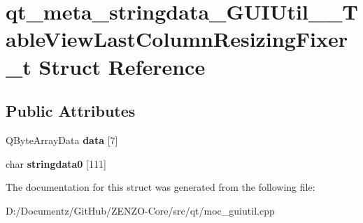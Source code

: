 \hypertarget{structqt__meta__stringdata___g_u_i_util_____table_view_last_column_resizing_fixer__t}{}\section{qt\+\_\+meta\+\_\+stringdata\+\_\+\+G\+U\+I\+Util\+\_\+\+\_\+\+Table\+View\+Last\+Column\+Resizing\+Fixer\+\_\+t Struct Reference}
\label{structqt__meta__stringdata___g_u_i_util_____table_view_last_column_resizing_fixer__t}
\subsection*{Public Attributes}
\begin{DoxyCompactItemize}
\item 
\mbox{\label{structqt__meta__stringdata___g_u_i_util_____table_view_last_column_resizing_fixer__t_a336a8969a03d636e3de5298bc473e6ed}} 
Q\+Byte\+Array\+Data {\bfseries data} \mbox{[}7\mbox{]}
\item 
\mbox{\label{structqt__meta__stringdata___g_u_i_util_____table_view_last_column_resizing_fixer__t_a2eb067f90e24e554c6df10510dc47709}} 
char {\bfseries stringdata0} \mbox{[}111\mbox{]}
\end{DoxyCompactItemize}


The documentation for this struct was generated from the following file\+:\begin{DoxyCompactItemize}
\item 
D\+:/\+Documentz/\+Git\+Hub/\+Z\+E\+N\+Z\+O-\/\+Core/src/qt/moc\+\_\+guiutil.\+cpp\end{DoxyCompactItemize}
